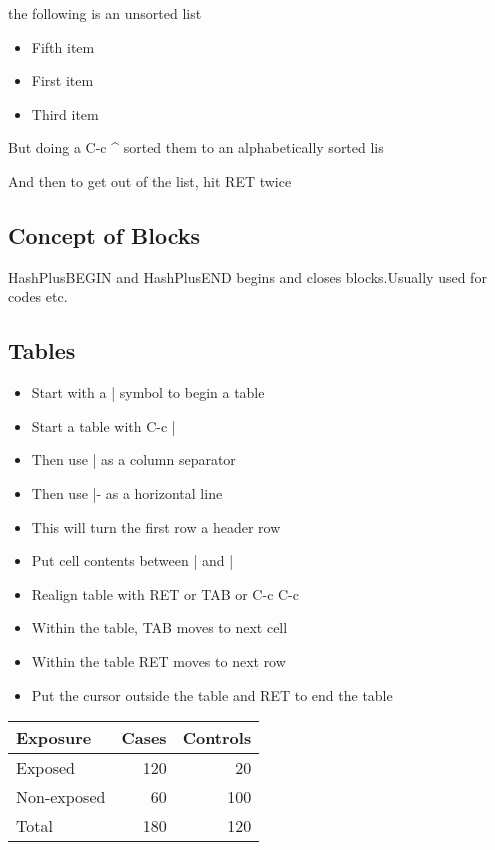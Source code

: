 \documentclass[11pt]{article}
\begin{document}
the following is an unsorted list

\begin{itemize}
\item Fifth item
\item First item
\item Third item
\end{itemize}
But doing a C-c \^{} sorted them to an alphabetically sorted lis

And then to get out of the list, hit RET twice

\subsection{Concept of Blocks}
\label{sec:org9b3a15b}
HashPlusBEGIN and HashPlusEND begins and closes blocks.Usually used for codes etc.

\subsection{Tables}
\label{sec:orgb65a152}
\begin{itemize}
\item Start with a | symbol to begin a table
\item Start a table with C-c |
\item Then use | as a column separator
\item Then use |- as a horizontal line
\item This will turn the first row a header row
\item Put cell contents between | and |
\item Realign table with RET or TAB or C-c C-c
\item Within the table, TAB moves to next cell
\item Within the table RET moves to next row
\item Put the cursor outside the table and RET to end the table
\end{itemize}


\begin{center}
\begin{tabular}{lrr}
Exposure & Cases & Controls\\
\hline
Exposed & 120 & 20\\
Non-exposed & 60 & 100\\
Total & 180 & 120\\
\end{tabular}
\end{center}
\end{document}

